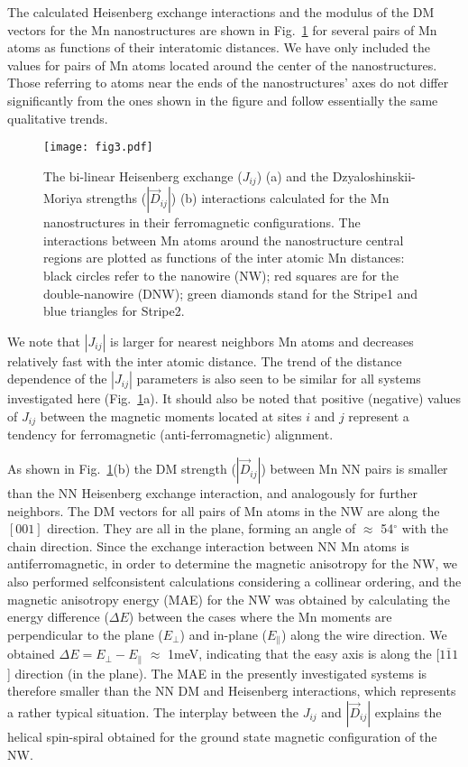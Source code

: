 \documentclass[prl,final,twocolumn]{revtex4-1}
\begin{document}
% 
The calculated Heisenberg exchange interactions and the modulus of the DM vectors for the Mn nanostructures are shown in Fig.~\ref{fig:jij-dm} for several pairs of Mn atoms as functions of their interatomic distances.
We have only included the values for pairs of Mn atoms located around the center of the nanostructures. Those referring to atoms near the ends of the nanostructures' axes do not differ significantly from the ones shown in the figure and follow essentially the same qualitative trends.
\begin{figure}[htp]
\texttt{[image: fig3.pdf]}
\caption{The bi-linear Heisenberg exchange ($J_{ij}$) (a) and the Dzyaloshinskii-Moriya strengths ($|\vec{D}_{ij}|$) (b) interactions calculated for the Mn nanostructures in their ferromagnetic configurations. The interactions between Mn atoms around the nanostructure central regions are plotted as functions of the inter atomic Mn distances: black circles refer to the nanowire (NW); red squares are for the double-nanowire (DNW); green diamonds stand for the Stripe1 and blue triangles for Stripe2. 
%  
}
\label{fig:jij-dm}
\end{figure}
We note that $|J_{ij}|$ is larger for nearest neighbors Mn atoms and decreases relatively fast with the inter atomic distance. The trend of the distance dependence of the $|J_{ij}|$ parameters is also seen to be similar for all systems investigated here (Fig.~\ref{fig:jij-dm}a). 
% 
It should also be noted that positive (negative) values of $J_{ij}$ between the magnetic moments located at sites $i$ and $j$ represent a tendency for ferromagnetic (anti-ferromagnetic) alignment.   

%  
As shown in Fig.~\ref{fig:jij-dm}(b) the DM strength ($|\vec{D}_{ij}|$) between Mn NN pairs is smaller than 
the NN Heisenberg exchange interaction, and analogously for further neighbors.
% 
The DM vectors for all pairs of Mn atoms in the NW are along the $[001]$ direction. They are all in the plane, forming an angle of  $\approx$ 54$^{\circ}$ with the chain direction.
Since the exchange interaction between NN Mn atoms is antiferromagnetic, in order to determine the magnetic  anisotropy for the NW, we also performed selfconsistent calculations considering a collinear ordering, and the magnetic anisotropy energy (MAE) for the NW was obtained by calculating the energy difference ($\Delta {E}$) between the cases where the Mn moments are perpendicular to the plane (${E}_{\perp}$) and in-plane (${E}_{\parallel}$) along the wire direction. We obtained $\Delta {E}={E}_{\perp} - {E}_{\parallel}$ $\approx$ 1meV, indicating that the easy axis is along the [$1\overline{1}1$] direction (in the plane). The MAE in the presently investigated systems is therefore smaller than the NN DM and Heisenberg interactions, which represents a rather typical situation.
% 
The interplay between the $J_{ij}$ and $|\vec{D}_{ij}|$ explains the helical spin-spiral obtained for the ground state magnetic configuration of the NW.
% 
\end{document}
